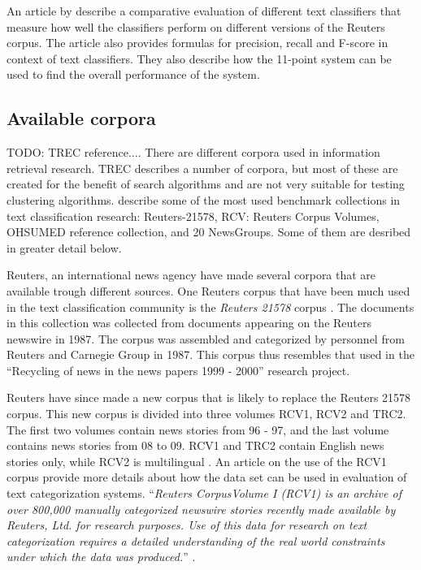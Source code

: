 An article by \cite{Yang1999} describe a comparative evaluation of different text classifiers that measure how well the classifiers perform on different versions of the Reuters corpus. The article also provides formulas for precision, recall and F-score in context of text classifiers. They also describe how the 11-point system can be used to find the overall performance of the system.


\subsection{Available corpora}
TODO: TREC reference....
There are different corpora used in information retrieval research. TREC describes a number of corpora, but most of these are created for the benefit of search algorithms and are not very suitable for testing clustering algorithms. \citeauthor{Baeza-Yates2011a} describe some of the most used benchmark collections in text classification research: Reuters-21578, RCV: Reuters Corpus Volumes, OHSUMED reference collection, and 20 NewsGroups. Some of them are desribed in greater detail below.

Reuters, an international news agency have made several corpora that are available trough different sources. One Reuters corpus that have been much used in the text classification community is the \textit{Reuters 21578} corpus \cite{Lewis2004a}. The documents in this collection was collected from documents appearing on the Reuters newswire in 1987. The corpus was assembled and categorized by personnel from Reuters and Carnegie Group in 1987. This corpus thus resembles that used in the ``Recycling of news in the news papers 1999 - 2000'' research project.

Reuters have since made a new corpus that is likely to replace the Reuters 21578 corpus. This new corpus is divided into three volumes RCV1, RCV2 and TRC2. The first two volumes contain news stories from 96 - 97, and the last volume contains news stories from 08 to 09. RCV1 and TRC2 contain English news stories only, while RCV2 is multilingual \cite{NationalInstituteofStandardsandTechnology2004}. An article on the use of the RCV1 corpus provide more details about how the data set can be used in evaluation of text categorization systems. ``\textit{Reuters CorpusVolume I (RCV1) is an archive of over 800,000 manually categorized newswire stories recently made available by Reuters, Ltd. for research purposes. Use of this data for research on text categorization requires a detailed understanding of the real world constraints under which the data was produced.}'' \cite{Lewis2004}. 

